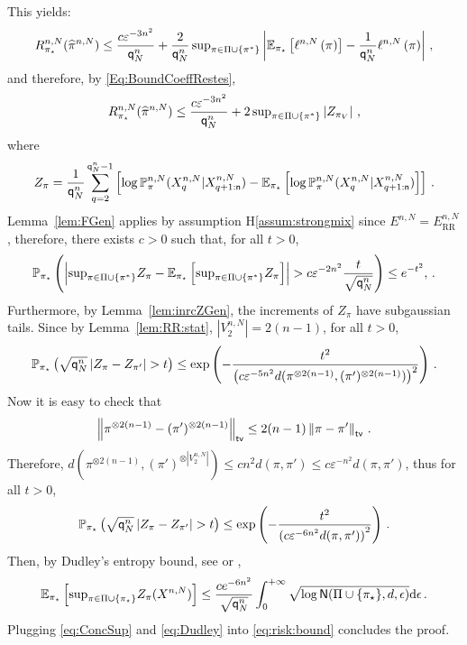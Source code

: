 This yields:
\begin{equation*}
 R^{n,N}_{\bayes}(\MLE^{n,N}) \le  \frac{c\varepsilon^{-3n^2}}{\ordermax{n}{N}} + \frac{2}{\ordermax{n}{N}}\,\sup_{\pi\in\Pi\cup\{\pi^*\}}\left|\E_{\bayes}\left[\Lo{n,N}{\pi}\right]-\frac{1}{\ordermax{n}{N}}\Lo{n,N}{\pi}\right|\eqsp,
\end{equation*}
%
and therefore, by \eqref{Eq:BoundCoeffRestes},
\begin{equation}
\label{eq:risk:bound}
R^{n,N}_{\bayes}(\MLE^{n,N}) \le  \frac{c\varepsilon^{-3n^2}}{\ordermax{n}{N}} + 2\,\sup_{\pi\in\Pi\cup\{\pi^*\}}\left|Z_{\pi_V}\right|\eqsp,
\end{equation}
%
where 
\[
Z_{\pi}=\frac1{{\mathsf{q}}^{n}_{N}}\sum_{q=2}^{{\mathsf{q}}^{n}_{N}-1}\left[\log \mathbb{P}^{n,N}_{\pi}(X^{n,N}_{q}|X^{n,N}_{q+1:{\mathsf n}})-\mathbb{E}_{\pi_{\star}}\left[\log \mathbb{P}^{n,N}_{\pi}(X^{n,N}_{q}|X^{n,N}_{q+1:{\mathsf n}})\right]\right]\,.
\]
Lemma~\ref{lem:FGen} applies by assumption H\ref{assum:strongmix} since $E^{n,N}=E^{n,N}_{\text{RR}}$, therefore, there exists $c>0$ such that, for all $t>0$,
\begin{equation}\label{eq:ConcSup}
\bP_{\bayes}\pa{\absj{\sup_{\pi\in\Pi\cup\{\pi^*\}}Z_{\pi}-\E_{\bayes}\cro{\sup_{\pi\in\Pi\cup\{\pi^*\}}Z_{\pi}}}>c\varepsilon^{-2n^2}\frac{t}{\sqrt{\ordermax{n}{N}}}}\le e^{-t^2},\eqsp.
\end{equation}
Furthermore, by Lemma~\ref{lem:inrcZGen}, the increments of $Z_\pi$ have subgaussian tails. Since by Lemma~\ref{lem:RR:stat}, $|V_2^{n,N}| = 2(n-1)$, for all $t>0$, 
\[
\bP_{\bayes}\pa{\sqrt{\ordermax{n}{N}}\absj{Z_{\pi}-Z_{\pi'}}>t}\le \exp\pa{-\frac{t^2}{\pa{c\varepsilon^{-5n^2}d(\pi^{\otimes 2(n-1)},(\pi')^{\otimes 2(n-1)})}^2}}\eqsp. 
\]
%
Now it is easy to check that
\[
\left\|\pi^{\otimes 2(n-1)}-(\pi')^{\otimes 2(n-1)}\right\|_{{\sf tv}}\le 2(n-1)\left\|\pi-\pi'\right\|_{{\sf tv}}\,.
\]
Therefore, $d(\pi^{\otimes 2(n-1)},(\pi')^{\otimes |V_2^{n,N}|})\le cn^2d(\pi,\pi')\le c\varepsilon^{-n^2}d(\pi,\pi')$, thus for all $t>0$,
\begin{equation}\label{eq:subGaussIncr}
\bP_{\bayes}\pa{\sqrt{\ordermax{n}{N}}\absj{Z_{\pi}-Z_{\pi'}}>t}\le \exp\pa{-\frac{t^2}{\pa{c\varepsilon^{-6n^2}d(\pi,\pi')}^2}}\eqsp. 
\end{equation}
Then, by Dudley's entropy bound, see \cite{MR0220340} or \cite[Proposition 2.1]{Talagrand:2014},
\begin{equation}\label{eq:Dudley}
\E_{\bayes}\cro{\sup_{\pi\in\Pi\cup\{\bayes\}}Z_{\pi}(X^{n,N})}\le \frac{ce^{-6n^2}}{\sqrt{\ordermax{n}{N}}}\int_0^{+\infty}\sqrt{\log \mathsf{N}(\Pi\cup\{\bayes\},d,\epsilon)}\rmd\epsilon\eqsp. 
\end{equation}
Plugging \eqref{eq:ConcSup} and \eqref{eq:Dudley} into \eqref{eq:risk:bound} concludes the proof.





